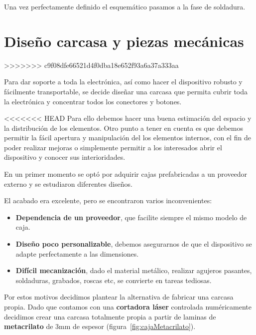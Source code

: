 Una vez perfectamente definido el esquemático pasamos a la fase de soldadura.

\newpage


\section{Diseño carcasa y piezas mecánicas}
>>>>>>> c9f08dfe66521d4f0dba18e652f93a6a37a333aa

Para dar soporte a toda la electrónica, así como hacer el dispositivo robusto y fácilmente transportable,
se decide diseñar una carcasa que permita cubrir toda la electrónica y concentrar todos los conectores y botones. 

<<<<<<< HEAD
Para ello debemos hacer una buena estimación del espacio y la distribución de los elementos. Otro punto a tener en cuenta es que debemos permitir la fácil apertura y manipulación del los elementos internos, con el fin de poder realizar mejoras o simplemente permitir a los interesados abrir el dispositivo y conocer sus interioridades. 

En un primer momento se optó por adquirir cajas prefabricadas a un proveedor externo y se estudiaron diferentes diseños.


El acabado era excelente, pero se encontraron varios inconvenientes:

\begin{itemize}
	\item \textbf{Dependencia de un proveedor}, que facilite siempre el mismo modelo de caja.
	\item \textbf{Diseño poco personalizable}, debemos asegurarnos de que el dispositivo se adapte perfectamente a las dimensiones.
	\item  \textbf{Difícil mecanización}, dado el material metálico, realizar agujeros pasantes, soldaduras, grabados, roscas etc, se convierte en tareas tediosas. 
\end{itemize}

Por estos motivos decidimos plantear la alternativa de fabricar una carcasa propia. Dado que contamos con una \textbf{cortadora láser} controlada numéricamente decidimos crear una carcasa totalmente propia a partir de laminas de \textbf{metacrilato} de 3mm de espesor (figura~\ref{fig:cajaMetacrilato}).

